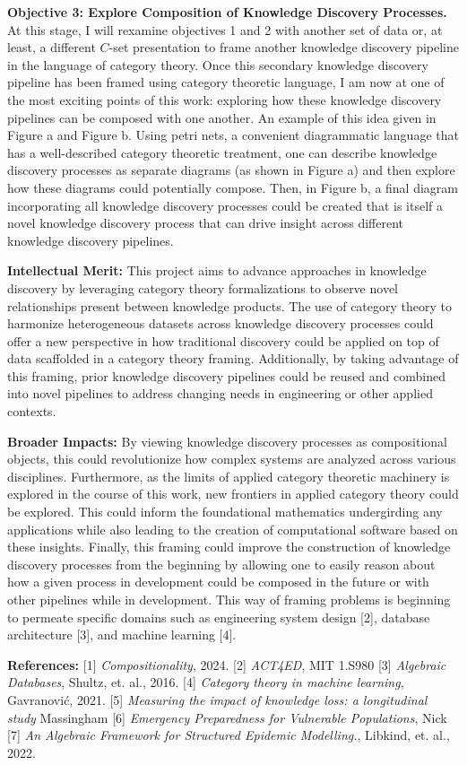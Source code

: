 \documentclass[11pt]{extarticle}
\begin{document}
\textbf{Objective 3: Explore Composition of Knowledge Discovery Processes.} At this stage, I will rexamine objectives 1 and 2 with another set of data or, at least, a different $C$-set presentation to frame another knowledge discovery pipeline in the language of category theory.
Once this secondary knowledge discovery pipeline has been framed using category theoretic language, I am now at one of the most exciting points of this work: exploring how these knowledge discovery pipelines can be composed with one another.
An example of this idea given in Figure a and Figure b.
Using petri nets, a convenient diagrammatic language that has a well-described category theoretic treatment, one can describe knowledge discovery processes as separate diagrams (as shown in Figure a) and then explore how these diagrams could potentially compose.
Then, in Figure b, a final diagram incorporating all knowledge discovery processes could be created that is itself a novel knowledge discovery process that can drive insight across different knowledge discovery pipelines.


\textbf{Intellectual Merit:} This project aims to advance approaches in knowledge discovery by leveraging category theory formalizations to observe novel relationships present between knowledge products. 
The use of category theory to harmonize heterogeneous datasets across knowledge discovery processes could offer a new perspective in how traditional discovery could be applied on top of data scaffolded in a category theory framing.
Additionally, by taking advantage of this framing, prior knowledge discovery pipelines could be reused and combined into novel pipelines to address changing needs in engineering or other applied contexts. 

\textbf{Broader Impacts:} By viewing knowledge discovery processes as compositional objects, this could revolutionize how complex systems are analyzed across various disciplines.
Furthermore, as the limits of applied category theoretic machinery is explored in the course of this work, new frontiers in applied category theory could be explored.
This could inform the foundational mathematics undergirding any applications while also leading to the creation of computational software based on these insights.
Finally, this framing could improve the construction of knowledge discovery processes from the beginning by allowing one to easily reason about how a given process in development could be composed in the future or with other pipelines while in development.
This way of framing problems is beginning to permeate specific domains such as engineering system design [2], database architecture [3], and machine learning [4]. %

\textbf{References:} [1] \textit{Compositionality}, 2024. [2] \textit{ACT4ED}, MIT 1.S980 [3] \textit{Algebraic Databases}, Shultz, et. al., 2016. [4] \textit{Category theory in machine learning}, Gavranović, 2021. [5] \textit{Measuring the impact of knowledge loss: a longitudinal study} Massingham [6] \textit{Emergency Preparedness for Vulnerable Populations}, Nick [7] \textit{An Algebraic Framework for Structured Epidemic Modelling.}, Libkind, et. al., 2022. 
\end{document}
